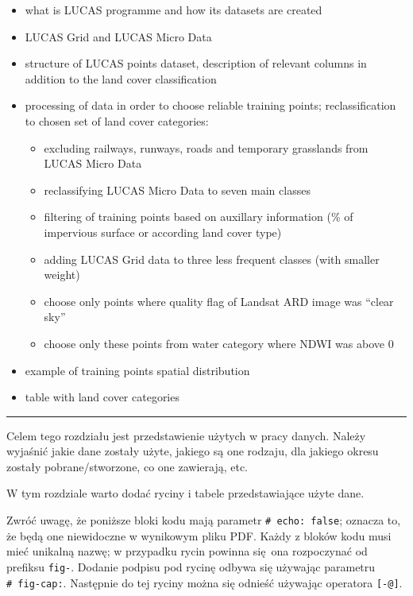 \documentclass{amuthesis}
\begin{document}
\begin{itemize}
\item
  what is LUCAS programme and how its datasets are created
\item
  LUCAS Grid and LUCAS Micro Data
\item
  structure of LUCAS points dataset, description of relevant columns in
  addition to the land cover classification
\item
  processing of data in order to choose reliable training points;
  reclassification to chosen set of land cover categories:

  \begin{itemize}
  \item
    excluding railways, runways, roads and temporary grasslands from
    LUCAS Micro Data
  \item
    reclassifying LUCAS Micro Data to seven main classes
  \item
    filtering of training points based on auxillary information (\% of
    impervious surface or according land cover type)
  \item
    adding LUCAS Grid data to three less frequent classes (with smaller
    weight)
  \item
    choose only points where quality flag of Landsat ARD image was
    ``clear sky''
  \item
    choose only these points from water category where NDWI was above 0
  \end{itemize}
\item
  example of training points spatial distribution
\item
  table with land cover categories
\end{itemize}

\begin{center}\rule{0.5\linewidth}{0.5pt}\end{center}

Celem tego rozdziału jest przedstawienie użytych w pracy danych. Należy
wyjaśnić jakie dane zostały użyte, jakiego są one rodzaju, dla jakiego
okresu zostały pobrane/stworzone, co one zawierają, etc.

W tym rozdziale warto dodać ryciny i tabele przedstawiające użyte dane.

Zwróć uwagę, że poniższe bloki kodu mają parametr
\texttt{\#\textbar{}\ echo:\ false}; oznacza to, że będą one niewidoczne
w wynikowym pliku PDF. Każdy z bloków kodu musi mieć unikalną nazwę; w
przypadku rycin powinna się~ona rozpoczynać od prefiksu \texttt{fig-}.
Dodanie podpisu pod rycinę odbywa się używając parametru
\texttt{\#\textbar{}\ fig-cap:}. Następnie do tej ryciny można się
odnieść używając operatora \texttt{{[}-@{]}}.
\end{document}
